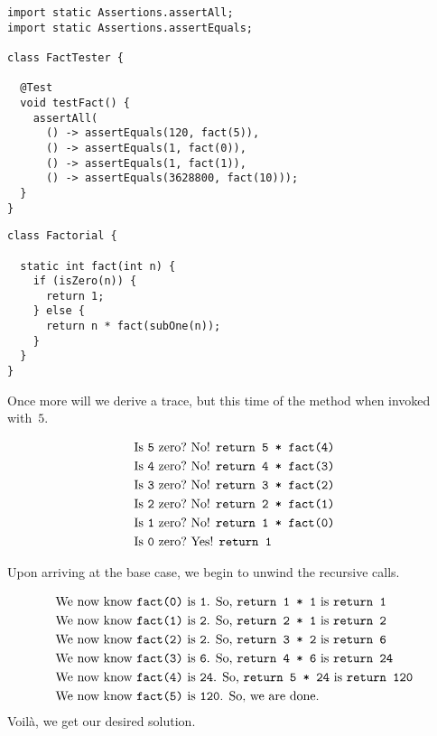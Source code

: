 \begin{lstlisting}[language=MyJava]
import static Assertions.assertAll;
import static Assertions.assertEquals;

class FactTester {
  
  @Test
  void testFact() {
    assertAll(
      () -> assertEquals(120, fact(5)),
      () -> assertEquals(1, fact(0)),
      () -> assertEquals(1, fact(1)),
      () -> assertEquals(3628800, fact(10)));
  }
}
\end{lstlisting}
\begin{lstlisting}[language=MyJava]
class Factorial {

  static int fact(int n) {
    if (isZero(n)) {
      return 1;
    } else {
      return n * fact(subOne(n));
    }
  }
}
\end{lstlisting}

Once more will we derive a trace, but this time of the  method when invoked with~$5$.

\begin{align*}
    \text{Is }\texttt{5} \text{ zero?} &\text{ No! }\texttt{return 5 * fact(4)}\\
    \text{Is }\texttt{4} \text{ zero?} &\text{ No! }\texttt{return 4 * fact(3)}\\
    \text{Is }\texttt{3} \text{ zero?} &\text{ No! }\texttt{return 3 * fact(2)}\\
    \text{Is }\texttt{2} \text{ zero?} &\text{ No! }\texttt{return 2 * fact(1)}\\
    \text{Is }\texttt{1} \text{ zero?} &\text{ No! }\texttt{return 1 * fact(0)}\\
    \text{Is }\texttt{0} \text{ zero?} &\text{ Yes! }\texttt{return 1}
\end{align*}

Upon arriving at the base case, we begin to unwind the recursive calls.

\begin{align*}
    &\text{We now know }\texttt{fact(0)} \text{ is }\texttt{1}\text{. So, } \texttt{return 1 * 1} \text{ is } \texttt{return 1}\\
    &\text{We now know }\texttt{fact(1)} \text{ is }\texttt{2}\text{. So, } \texttt{return 2 * 1} \text{ is } \texttt{return 2}\\
    &\text{We now know }\texttt{fact(2)} \text{ is }\texttt{2}\text{. So, } \texttt{return 3 * 2} \text{ is } \texttt{return 6}\\
    &\text{We now know }\texttt{fact(3)} \text{ is }\texttt{6}\text{. So, } \texttt{return 4 * 6} \text{ is } \texttt{return 24}\\
    &\text{We now know }\texttt{fact(4)} \text{ is }\texttt{24}\text{. So, } \texttt{return 5 * 24} \text{ is } \texttt{return 120}\\
    &\text{We now know }\texttt{fact(5)} \text{ is }\texttt{120}\text{. So, } \text{we are done.} 
\end{align*}
Voil\`a, we get our desired solution.

